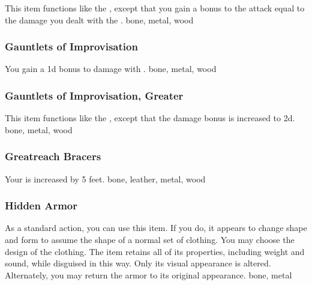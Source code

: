 This item functions like the , except that you gain a bonus to the  attack equal to the damage you dealt with the .
 
 bone, metal, wood
\lowercase{\hypertarget{item:Gauntlets of Improvisation}{}}\label{item:Gauntlets of Improvisation}
\hypertarget{item:Gauntlets of Improvisation}{\subsubsection{Gauntlets of Improvisation\hfill{}}}
You gain a \plus1d bonus to damage with .
 
 bone, metal, wood
\lowercase{\hypertarget{item:Gauntlets of Improvisation, Greater}{}}\label{item:Gauntlets of Improvisation, Greater}
\hypertarget{item:Gauntlets of Improvisation, Greater}{\subsubsection{Gauntlets of Improvisation, Greater\hfill{}}}
This item functions like the , except that the damage bonus is increased to \plus2d.
 
 bone, metal, wood
\lowercase{\hypertarget{item:Greatreach Bracers}{}}\label{item:Greatreach Bracers}
\hypertarget{item:Greatreach Bracers}{\subsubsection{Greatreach Bracers\hfill{}}}
Your  is increased by 5 feet.
 
 bone, leather, metal, wood
\lowercase{\hypertarget{item:Hidden Armor}{}}\label{item:Hidden Armor}
\hypertarget{item:Hidden Armor}{\subsubsection{Hidden Armor\hfill{}}}
As a standard action, you can use this item.
If you do, it appears to change shape and form to assume the shape of a normal set of clothing.
You may choose the design of the clothing.
The item retains all of its properties, including weight and sound, while disguised in this way.
Only its visual appearance is altered.
Alternately, you may return the armor to its original appearance.
 
 bone, metal
\lowercase{\hypertarget{item:Mask of Air}{}}\label{item:Mask of Air}
